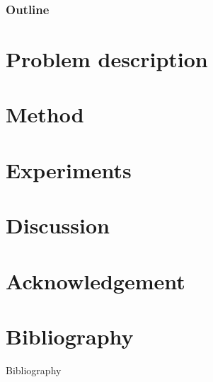 \documentclass[aspectratio=169]{beamer}
\begin{document}
\frame{\titlepage}                     %

\begin{frame}
  \frametitle{Outline}
  \tableofcontents
\end{frame}







\section{Problem description}

% 

% 


\section{Method}
% 
% 
% 





% 
% 


\section{Experiments}

% 
% 
% 


\section{Discussion}
% 



\section{Acknowledgement}



\section{Bibliography}
\appendix

\begin{frame}{Bibliography}
    \printbibliography[heading=none]
\end{frame}
\end{document}
